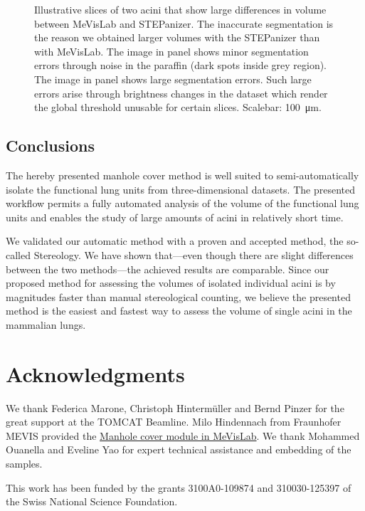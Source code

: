 \documentclass[%
	draft,
	paper=a4,%
	abstract=true,%
	]{scrartcl}
\begin{document}
\begin{figure}
{		\label{subfig:60e_acinus38}%
	}%
	\hfill%
	\caption{Illustrative slices of two acini that show large differences in volume between MeVisLab and STEPanizer. The inaccurate segmentation is the reason we obtained larger volumes with the STEPanizer than with MeVisLab. The image in panel  shows minor segmentation errors through noise in the paraffin (dark spots inside grey region). The image in panel  shows large segmentation errors. Such large errors arise through brightness changes in the dataset which render the global threshold unusable for certain slices. Scalebar: \SI{100}{\micro\meter}.}
	\label{fig:MeVisSegmentation}
\end{figure}

\subsection{Conclusions}
The hereby presented manhole cover method is well suited to semi-automatically isolate the functional lung units from three-dimensional datasets. The presented workflow permits a fully automated analysis of the volume of the functional lung units and enables the study of large amounts of acini in relatively short time.

We validated our automatic method with a proven and accepted method, the so-called Stereology. We have shown that---even though there are slight differences between the two methods---the achieved results are comparable. Since our proposed method for assessing the volumes of isolated individual acini is by magnitudes faster than manual stereological counting, we believe the presented method is the easiest and fastest way to assess the volume of single acini in the mammalian lungs.

\clearpage
\section{Acknowledgments}
We thank Federica Marone, Christoph Hintermüller and Bernd Pinzer for the great support at the TOMCAT Beamline. Milo Hindennach from Fraunhofer MEVIS provided the \href{http://www.mevis-research.de/cgi-bin/discus/board-auth.cgi?lm=1282233250&file=/839/11760.html}{Manhole cover module in MeVisLab}. We thank Mohammed Ouanella and Eveline Yao for expert technical assistance and embedding of the samples.

This work has been funded by the grants 3100A0-109874 and 310030-125397 of the Swiss National Science Foundation.

\clearpage
\singlespacing


\end{document}
